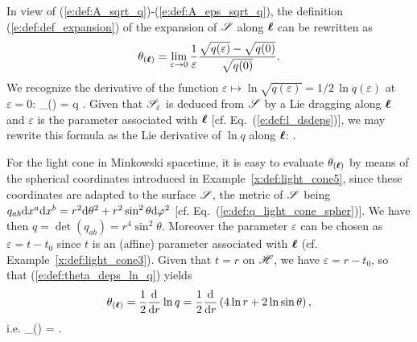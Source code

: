 In view of (\ref{e:def:A_sqrt_q})-(\ref{e:def:A_eps_sqrt_q}), the definition (\ref{e:def:def_expansion})
of the expansion of $\mathscr{S}$ along $\bm{\ell}$ can be rewritten as
\[
    \theta_{(\bm{\ell})} = \lim_{\varepsilon\rightarrow 0} \frac{1}{\varepsilon}
    \frac{\sqrt{q(\varepsilon)} - \sqrt{q(0)}}{\sqrt{q(0)}} .
\]
We recognize the derivative of the function $\varepsilon \mapsto \ln \sqrt{q(\varepsilon)}=
1/2\, \ln q(\varepsilon)$ at $\varepsilon=0$:
\be \label{e:def:theta_deps_ln_q}
     \theta_{(\wl)} =  \frac{\D}{\D\varepsilon}  \ln q .
\ee
Given that $\mathscr{S}_\varepsilon$ is deduced from $\mathscr{S}$ by a Lie dragging along $\bm{\ell}$
and $\varepsilon$ is the parameter associated with $\bm{\ell}$ [cf. Eq.~(\ref{e:def:l_dsdeps})], we may
rewrite this formula as the Lie derivative of $\ln q$ along $\bm{\ell}$:
\be \label{e:def:theta_Lie_ln_q}
    .
\ee
\begin{example} \label{x:def:light_cone6}
For the light cone in Minkowski spacetime,
it is easy to evaluate $\theta_{(\bm{\ell})}$ by means of the spherical coordinates
introduced in Example~\ref{x:def:light_cone5}, since these coordinates are adapted to the
surface $\mathscr{S}$, the metric of $\mathscr{S}$ being $q_{ab} \mathrm{d} x^a \mathrm{d} x^b = r^2 \mathrm{d} \theta^2
+ r^2\sin^2\theta \mathrm{d} \varphi^2$ [cf. Eq.~(\ref{e:def:q_light_cone_spher})].
We have then  $q = \det(q_{ab}) = r^4\sin^2\theta$. Moreover the parameter $\varepsilon$
can be chosen as $\varepsilon = t - t_0$ since $t$ is an (affine) parameter
associated with $\bm{\ell}$ (cf. Example~\ref{x:def:light_cone3}). Given that
$t=r$ on $\mathscr{H}$, we have $\varepsilon = r - t_0$, so that (\ref{e:def:theta_deps_ln_q})
yields
\[
    \theta_{(\bm{\ell})} = \frac{1}{2} \frac{\mathrm{d}}{\mathrm{d} r}  \ln q =
         \frac{1}{2} \frac{\mathrm{d}}{\mathrm{d} r} \left( 4 \ln r + 2 \ln\sin\theta \right) ,
\]
i.e.
\be \label{e:def:theta_light_cone}
    \theta_{(\wl)} =  .
\ee
\end{example}


